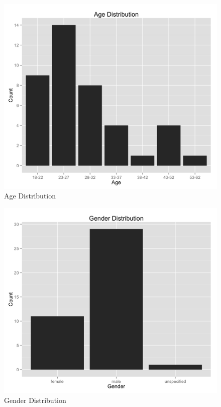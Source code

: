 \begin{figure}
    \centering
    \includegraphics[width=1.0\linewidth]{../study-2/results/graphs/age.png}
    \caption{Age Distribution}
    \label{agedistribution}
\end{figure}

\begin{figure}
    \centering
    \includegraphics[width=1.0\linewidth]{../study-2/results/graphs/gender.png}
    \caption{Gender Distribution}
    \label{genderdistribution}
\end{figure}

